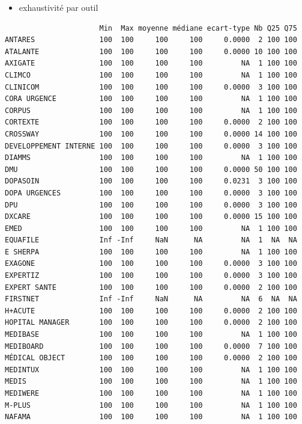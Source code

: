\documentclass[]{article}
\begin{document}
\begin{itemize}
\itemsep1pt\parskip0pt
\item
  exhaustivité par outil
\end{itemize}

\begin{verbatim}
                      Min  Max moyenne médiane ecart-type Nb Q25 Q75
ANTARES               100  100     100     100     0.0000  2 100 100
ATALANTE              100  100     100     100     0.0000 10 100 100
AXIGATE               100  100     100     100         NA  1 100 100
CLIMCO                100  100     100     100         NA  1 100 100
CLINICOM              100  100     100     100     0.0000  3 100 100
CORA URGENCE          100  100     100     100         NA  1 100 100
CORPUS                100  100     100     100         NA  1 100 100
CORTEXTE              100  100     100     100     0.0000  2 100 100
CROSSWAY              100  100     100     100     0.0000 14 100 100
DEVELOPPEMENT INTERNE 100  100     100     100     0.0000  3 100 100
DIAMMS                100  100     100     100         NA  1 100 100
DMU                   100  100     100     100     0.0000 50 100 100
DOPASOIN              100  100     100     100     0.0231  3 100 100
DOPA URGENCES         100  100     100     100     0.0000  3 100 100
DPU                   100  100     100     100     0.0000  3 100 100
DXCARE                100  100     100     100     0.0000 15 100 100
EMED                  100  100     100     100         NA  1 100 100
EQUAFILE              Inf -Inf     NaN      NA         NA  1  NA  NA
E SHERPA              100  100     100     100         NA  1 100 100
EXAGONE               100  100     100     100     0.0000  3 100 100
EXPERTIZ              100  100     100     100     0.0000  3 100 100
EXPERT SANTE          100  100     100     100     0.0000  2 100 100
FIRSTNET              Inf -Inf     NaN      NA         NA  6  NA  NA
H+ACUTE               100  100     100     100     0.0000  2 100 100
HOPITAL MANAGER       100  100     100     100     0.0000  2 100 100
MEDIBASE              100  100     100     100         NA  1 100 100
MEDIBOARD             100  100     100     100     0.0000  7 100 100
MÉDICAL OBJECT        100  100     100     100     0.0000  2 100 100
MEDINTUX              100  100     100     100         NA  1 100 100
MEDIS                 100  100     100     100         NA  1 100 100
MEDIWERE              100  100     100     100         NA  1 100 100
M-PLUS                100  100     100     100         NA  1 100 100
NAFAMA                100  100     100     100         NA  1 100 100

\end{verbatim}
\end{document}
